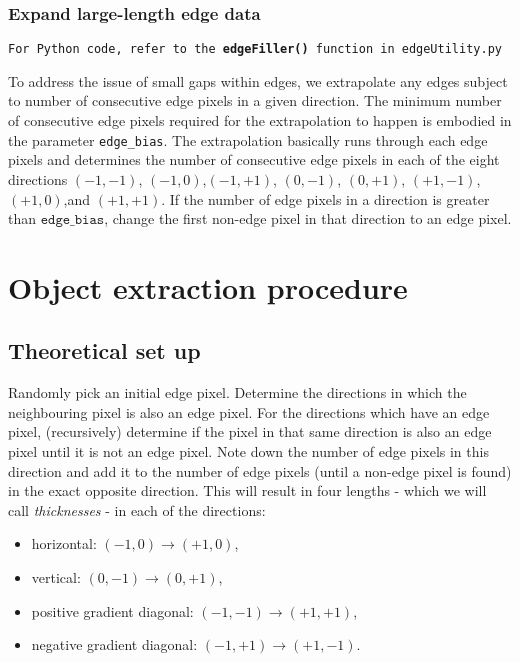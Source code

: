 \documentclass[11pt]{article}
\begin{document}
\subsubsection{Expand large-length edge data}
\begin{center}
\texttt{For Python code, refer to the {\bf edgeFiller()} function in edgeUtility.py}
\end{center}
To address the issue of small gaps within edges, we extrapolate any edges subject to number of consecutive edge pixels in a given direction. The minimum number of consecutive edge pixels required for the extrapolation to happen is embodied in the parameter \texttt{edge\_bias}. The extrapolation basically runs through each edge pixels and determines the number of consecutive edge pixels in each of the eight directions $(-1,-1)$, $(-1,0)$,$(-1,+1)$, $(0,-1)$, $(0,+1)$, $(+1,-1)$, $(+1,0)$,and $(+1,+1)$. If the number of edge pixels in a direction is greater than $\texttt{edge\_bias}$, change the first non-edge pixel in that direction to an edge pixel.



\section{Object extraction procedure}
\subsection{Theoretical set up}
Randomly pick an initial edge pixel. Determine the directions in which the neighbouring pixel is also an edge pixel. For the directions which have an edge pixel, (recursively) determine if the pixel in that same direction is also an edge pixel until it is not an edge pixel. Note down the number of edge pixels in this direction and add it to the number of edge pixels (until a non-edge pixel is found) in the exact opposite direction. This will result in four lengths - which we will call \textit{thicknesses} - in each of the directions:
\begin{itemize}
  \item horizontal: $(-1,0)\rightarrow (+1,0)$,
  \item vertical: $(0,-1)\rightarrow (0,+1)$, 
  \item positive gradient diagonal: $(-1,-1)\rightarrow (+1,+1)$, 
  \item negative gradient diagonal: $(-1,+1)\rightarrow (+1,-1)$.
\end{itemize}
\end{document}
